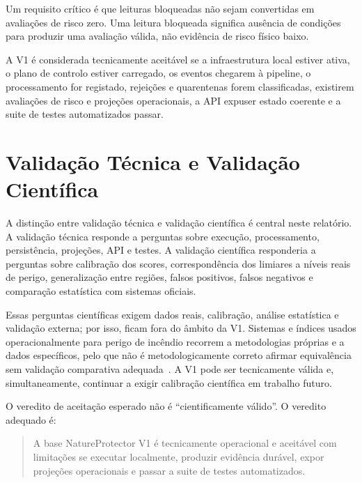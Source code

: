 Um requisito crítico é que leituras bloqueadas não sejam convertidas em avaliações de risco zero. Uma leitura bloqueada significa ausência de condições para produzir uma avaliação válida, não evidência de risco físico baixo.

A V1 é considerada tecnicamente aceitável se a infraestrutura local estiver ativa, o plano de controlo estiver carregado, os eventos chegarem à pipeline, o processamento for registado, rejeições e quarentenas forem classificadas, existirem avaliações de risco e projeções operacionais, a API expuser estado coerente e a suite de testes automatizados passar.

\section{Validação Técnica e Validação Científica}

A distinção entre validação técnica e validação científica é central neste relatório. A validação técnica responde a perguntas sobre execução, processamento, persistência, projeções, API e testes. A validação científica responderia a perguntas sobre calibração dos scores, correspondência dos limiares a níveis reais de perigo, generalização entre regiões, falsos positivos, falsos negativos e comparação estatística com sistemas oficiais.

Essas perguntas científicas exigem dados reais, calibração, análise estatística e validação externa; por isso, ficam fora do âmbito da V1. Sistemas e índices usados operacionalmente para perigo de incêndio recorrem a metodologias próprias e a dados específicos, pelo que não é metodologicamente correto afirmar equivalência sem validação comparativa adequada~\citep{nrcan_fwi_system,ipma_fwi,ipma_pir_rcm,ec_jrc_effis}. A V1 pode ser tecnicamente válida e, simultaneamente, continuar a exigir calibração científica em trabalho futuro.

O veredito de aceitação esperado não é ``cientificamente válido''. O veredito adequado é:

\begin{quote}
A base NatureProtector V1 é tecnicamente operacional e aceitável com limitações se executar localmente, produzir evidência durável, expor projeções operacionais e passar a suite de testes automatizados.
\end{quote}